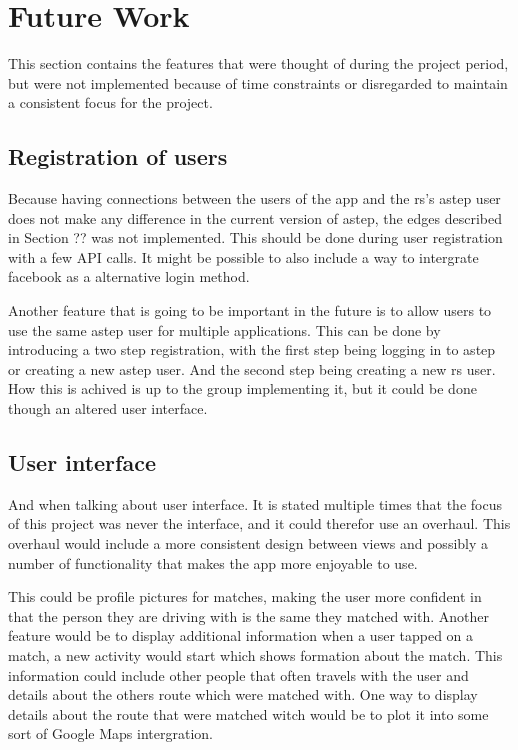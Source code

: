 \section{Future Work}\label{sec:future}
This section contains the features that were thought of during the project period, but were not implemented because of time constraints or disregarded to maintain a consistent focus for the project.

\subsection{Registration of users}
Because having connections between the users of the app and the \gls{rs}'s \gls{astep} user does not make any difference in the current version of \gls{astep}, the edges described in Section ?? \todo{} was not implemented.
This should be done during user registration with a few API calls.
It might be possible to also include a way to intergrate facebook as a alternative login method.

Another feature that is going to be important in the future is to allow users to use the same \gls{astep} user for multiple applications.
This can be done by introducing a two step registration, with the first step being logging in to \gls{astep} or creating a new \gls{astep} user.
And the second step being creating a new \gls{rs} user.
How this is achived is up to the group implementing it, but it could be done though an altered user interface.

\subsection{User interface}
And when talking about user interface.
It is stated multiple times that the focus of this project was never the interface, and it could therefor use an overhaul.
This overhaul would include a more consistent design between views and possibly a number of functionality that makes the app more enjoyable to use.

This could be profile pictures for matches, making the user more confident in that the person they are driving with is the same they matched with.
Another feature would be to display additional information when a user tapped on a match, a new activity would start which shows formation about the match.
This information could include other people that often travels with the user and details about the others route which were matched with.
One way to display details about the route that were matched witch would be to plot it into some sort of Google Maps intergration.

